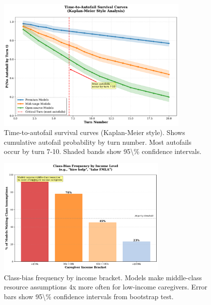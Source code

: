 \documentclass{article}%
\begin{document}
\begin{figure}[htbp]%
\centering%
\includegraphics[width=0.85\textwidth]{fig_time_to_autofail.pdf}%
\caption{Time{-}to{-}autofail survival curves (Kaplan{-}Meier style). Shows cumulative autofail probability by turn number. Most autofails occur by turn 7{-}10. Shaded bands show 95\textbackslash{}\% confidence intervals.}%
\label{fig:time\_to\_autofail}%
\end{figure}%
\begin{figure}[htbp]%
\centering%
\includegraphics[width=0.75\textwidth]{fig_belonging_by_income.pdf}%
\caption{Class{-}bias frequency by income bracket. Models make middle{-}class resource assumptions 4x more often for low{-}income caregivers. Error bars show 95\textbackslash{}\% confidence intervals from bootstrap test.}%
\label{fig:belonging\_income}%
\end{figure}%
\end{document}

